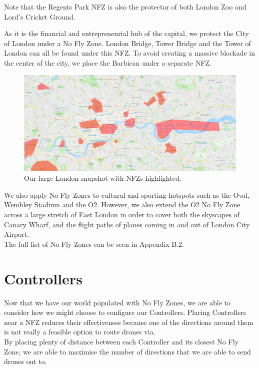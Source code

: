 \documentclass[a4paper,11pt,titlepage]{report}
\begin{document}
Note that the Regents Park NFZ is also the protector of both London Zoo and Lord's Cricket Ground.

As it is the financial and entrepreneurial hub of the capital, we protect the City of London under a No Fly Zone. London Bridge, Tower Bridge and the Tower of London can all be found under this NFZ. To avoid creating a massive blockade in the center of the city, we place the Barbican under a separate NFZ.

\begin{figure}[!hbpt]
  \center
  \includegraphics[width=\linewidth]{img/london_snapshot_large_nfzs.png}
  \caption{Our large London snapshot with NFZs highlighted.}
  \label{fig:london_snapshot_large_nfzs}
\end{figure}

We also apply No Fly Zones to cultural and sporting hotspots such as the Oval, Wembley Stadium and the O2. However, we also extend the O2 No Fly Zone across a large stretch of East London in order to cover both the skyscapes of Canary Wharf, and the flight paths of planes coming in and out of London City Airport.\\

The full list of No Fly Zones can be seen in Appendix B.2.

\section{Controllers}
Now that we have our world populated with No Fly Zones, we are able to consider how we might choose to configure our Controllers. Placing Controllers near a NFZ reduces their effectiveness because one of the directions around them is not really a feasible option to route drones via.\\

By placing plenty of distance between each Controller and its closest No Fly Zone, we are able to maximise the number of directions that we are able to send drones out to.
\end{document}
